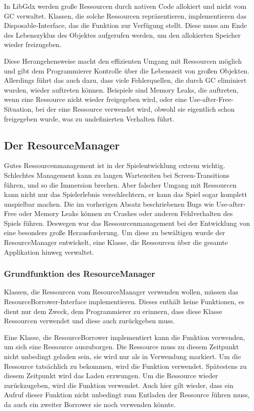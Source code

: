 In LibGdx werden große Ressourcen durch nativen Code allokiert und nicht vom GC verwaltet.
Klassen, die solche Ressourcen repräsentieren, implementieren das Disposable-Interface, das die
 Funktion zur Verfügung stellt.
Diese muss am Ende des Lebenszyklus des Objektes aufgerufen werden, um den allokierten Speicher wieder freizugeben.

Diese Herangehensweise macht den effizienten Umgang mit Ressourcen möglich und gibt dem Programmierer Kontrolle über
die Lebenszeit von großen Objekten.
Allerdings führt das auch dazu, dass viele Fehlerquellen, die durch GC eliminiert wurden, wieder auftreten können.
Beispiele sind Memory Leaks, die auftreten, wenn eine Ressource nicht wieder freigegeben wird, oder eine
Use-after-Free-Situation, bei der eine Ressource verwendet wird, obwohl sie eigentlich schon freigegeben wurde, was
zu undefinierten Verhalten führt.

\subsection{Der ResourceManager}

Gutes Ressourcenmanagement ist in der Spielentwicklung extrem wichtig.
Schlechtes Management kann \zB zu langen Wartezeiten bei Screen-Transitions führen, und so die Immersion brechen.
Aber falscher Umgang mit Ressourcen kann nicht nur das Spielerlebnis verschlechtern, er kann das Spiel sogar
komplett unspielbar machen.
Die im vorherigen Absatz beschriebenen Bugs wie Use-after-Free oder Memory Leaks können zu Crashes oder anderen
Fehlverhalten des Spiels führen.
Deswegen war das Ressourcenmanagement bei der Entwicklung von \FF eine besonders große Herausforderung.
Um diese zu bewältigen wurde der ResourceManager entwickelt, eine Klasse, die Ressourcen über die gesamte
Applikation hinweg verwaltet.

\subsubsection{Grundfunktion des ResourceManager}

Klassen, die Ressourcen vom ResourceManager verwenden wollen, müssen das ResourceBorrower-Interface implementieren.
Dieses enthält keine Funktionen, es dient nur dem Zweck, dem Programmierer zu erinnern, dass diese Klasse Ressourcen
verwendet und diese auch zurückgeben muss.

Eine Klasse, die ResourceBorrower implementiert kann die  Funktion verwenden,
um sich eine Ressource auszuborgen.
Die Ressource muss zu diesem Zeitpunkt nicht unbedingt geladen sein, sie wird nur als in Verwendung markiert.
Um die Ressource tatsächlich zu bekommen, wird die  Funktion verwendet.
Spätestens zu diesem Zeitpunkt wird das Laden erzwungen.
Um die Ressource wieder zurückzugeben, wird die  Funktion verwendet.
Auch hier gilt wieder, dass ein Aufruf dieser Funktion nicht unbedingt zum Entladen der Ressource führen muss,
da auch ein zweiter Borrower sie noch verwenden könnte.


